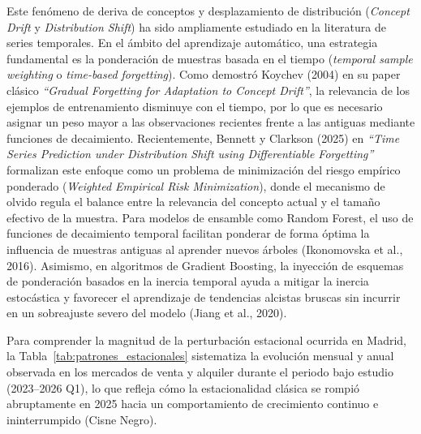 \documentclass[a4paper,11pt,openany]{book}
\begin{document}
Este fenómeno de deriva de conceptos y desplazamiento de distribución (\textit{Concept Drift} y \textit{Distribution Shift}) ha sido ampliamente estudiado en la literatura de series temporales. En el ámbito del aprendizaje automático, una estrategia fundamental es la ponderación de muestras basada en el tiempo (\textit{temporal sample weighting} o \textit{time-based forgetting}). Como demostró Koychev (2004) en su paper clásico \textit{``Gradual Forgetting for Adaptation to Concept Drift''}, la relevancia de los ejemplos de entrenamiento disminuye con el tiempo, por lo que es necesario asignar un peso mayor a las observaciones recientes frente a las antiguas mediante funciones de decaimiento. Recientemente, Bennett y Clarkson (2025) en \textit{``Time Series Prediction under Distribution Shift using Differentiable Forgetting''} formalizan este enfoque como un problema de minimización del riesgo empírico ponderado (\textit{Weighted Empirical Risk Minimization}), donde el mecanismo de olvido regula el balance entre la relevancia del concepto actual y el tamaño efectivo de la muestra. Para modelos de ensamble como Random Forest, el uso de funciones de decaimiento temporal facilitan ponderar de forma óptima la influencia de muestras antiguas al aprender nuevos árboles (Ikonomovska et al., 2016). Asimismo, en algoritmos de Gradient Boosting, la inyección de esquemas de ponderación basados en la inercia temporal ayuda a mitigar la inercia estocástica y favorecer el aprendizaje de tendencias alcistas bruscas sin incurrir en un sobreajuste severo del modelo (Jiang et al., 2020).

Para comprender la magnitud de la perturbación estacional ocurrida en Madrid, la Tabla~\ref{tab:patrones_estacionales} sistematiza la evolución mensual y anual observada en los mercados de venta y alquiler durante el periodo bajo estudio (2023--2026 Q1), lo que refleja cómo la estacionalidad clásica se rompió abruptamente en 2025 hacia un comportamiento de crecimiento continuo e ininterrumpido (Cisne Negro).
\end{document}
